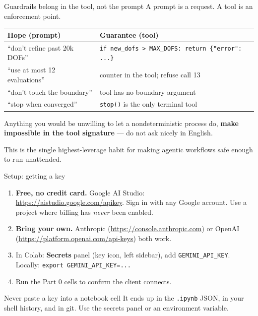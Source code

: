 \documentclass[aspectratio=169,10pt]{beamer}
\newcommand{\code}[1]{\texttt{\small #1}}
\newcommand{\hl}[1]{\textcolor{accent}{\textbf{#1}}}
\begin{document}
\begin{frame}{Guardrails belong in the tool, not the prompt}
A prompt is a request. A tool is an enforcement point.

\vspace{0.8em}
\begin{center}
\begin{tabular}{ll}
\toprule
\textbf{Hope} (prompt) & \textbf{Guarantee} (tool) \\
\midrule
``don't refine past 20k DOFs'' & \code{if new\_dofs > MAX\_DOFS: return \{"error": ...\}} \\
``use at most 12 evaluations'' & counter in the tool; refuse call 13 \\
``don't touch the boundary'' & tool has no boundary argument \\
``stop when converged''       & \code{stop()} is the only terminal tool \\
\bottomrule
\end{tabular}
\end{center}

\vspace{1em}
Anything you would be unwilling to let a nondeterministic process do,
\hl{make impossible in the tool signature} --- do not ask nicely in English.

\vspace{0.5em}
This is the single highest-leverage habit for making agentic workflows safe
enough to run unattended.
\end{frame}

\begin{frame}{Setup: getting a key}
\begin{enumerate}\itemsep6pt
  \item \textbf{Free, no credit card.} Google AI Studio:
        \url{https://aistudio.google.com/apikey}. Sign in with any Google account.
        Use a project where billing has \emph{never} been enabled.
  \item \textbf{Bring your own.} Anthropic
        (\url{https://console.anthropic.com}) or OpenAI
        (\url{https://platform.openai.com/api-keys}) both work.
  \item In Colab: \textbf{Secrets} panel (key icon, left sidebar), add
        \code{GEMINI\_API\_KEY}. Locally: \code{export GEMINI\_API\_KEY=...}
  \item Run the Part 0 cells to confirm the client connects.
\end{enumerate}

\vfill
\begin{block}{Never paste a key into a notebook cell}
It ends up in the \code{.ipynb} JSON, in your shell history, and in git.
Use the secrets panel or an environment variable.
\end{block}
\end{frame}
\end{document}
